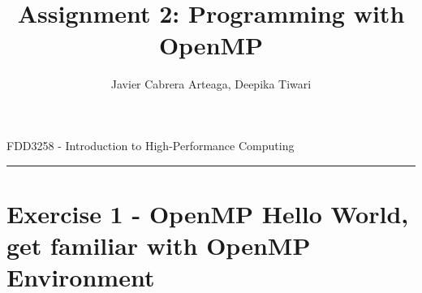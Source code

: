 \documentclass[12pt]{article}
\begin{document}
 
 
\title{Assignment 2: Programming with OpenMP} %
\author{Javier Cabrera Arteaga, Deepika Tiwari} %
 
\maketitle

{%
\centering
FDD3258 - Introduction to High-Performance Computing
\par
}
\hrule
\vspace{.2in}


\section{Exercise 1 - OpenMP Hello World, get familiar with OpenMP Environment}
\end{document}
